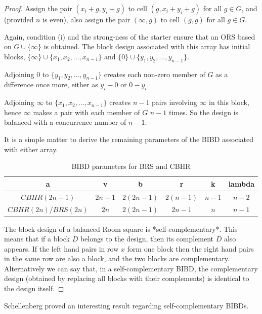 \documentclass[
  11pt,
  a4paper]{book}
\begin{document}
\begin{proof}
Assign the pair $(x_i + g, y_i + g)$ to cell
$(g, x_i + y_i + g)$ for all $g \in G$, and (provided $n$ is
even), also assign the pair $(\infty, g)$ to cell $(g, g)$
for all $g \in G$.

Again, condition (i) and the strong-ness of the starter ensure that an
ORS based on $G \cup \{\infty\}$ is obtained. The block design
associated with this array has initial blocks,
$\{\infty\} \cup \{x_1, x_2, \ldots, x_{n - 1}\}$
and
$\{0\} \cup \{y_1, y_2, \ldots, y_{n - 1}\}$.

Adjoining 0 to $\{y_1, y_2, \ldots, y_{n - 1}\}$
creates each non-zero member of $G$ as a difference once
more, either as $y_i - 0$ or $0 - y_i$.

Adjoining $\infty$ to $\{x_1, x_2, \ldots, x_{n - 1}\}$
creates $n - 1$ pairs involving $\infty$ in this block,
hence $\infty$ makes a pair with each member of $G$ $n-1$
times. So the design is balanced with a concurrence number
of $n-1$.

It is a simple matter to derive the remaining parameters of the BIBD
associated with either array.

\begin{table}

\caption{\label{tab:unnamed-chunk-6}BIBD parameters for BRS and CBHR}
\centering
\begin{tabular}[t]{cccccc}
\toprule
a & v & b & r & k & lambda\\
\midrule
$CBHR(2n-1)$ & $2n - 1$ & $2(2n - 1)$ & $2(n - 1)$ & $n - 1$ & $n - 2$\\
$CBHR(2n)/BRS(2n)$ & $2n$ & $2(2n - 1)$ & $2n - 1$ & $n$ & $n - 1$\\
\bottomrule
\end{tabular}
\end{table}

The block design of a balanced Room square is *self-complementary*. This
means that if a block $D$ belongs to the design, then its complement
$\overline{D}$ also appears. If the left hand pairs in row $x$ form one
block then the right hand pairs in the same row are also a block, and
the two blocks are complementary. Alternatively we can say that, in a
self-complementary BIBD, the complementary design (obtained by replacing
all blocks with their complements) is identical to the design itself.
\end{proof}

Schellenberg proved an interesting result regarding
self-complementary BIBDs.
\end{document}
